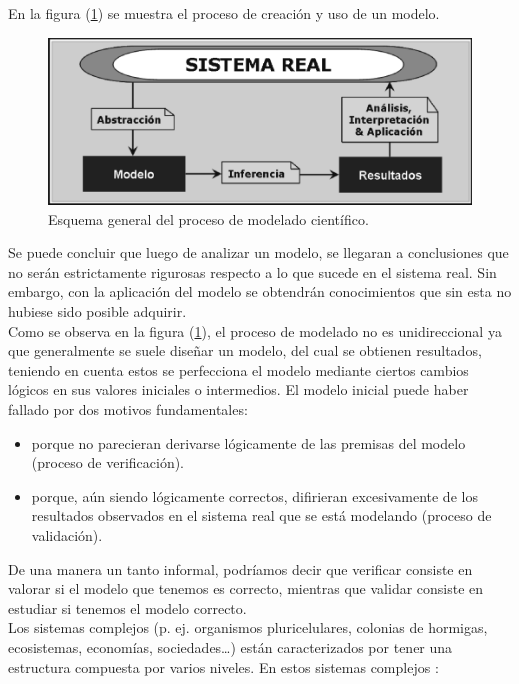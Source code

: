 En la figura (\ref{fig:img_1}) se muestra el proceso de creación y uso de un modelo.

\begin{figure}[!h]
	\centering
	\includegraphics[scale=0.5]{Images/esquema_modelado_cientifico.png}
	\caption{Esquema general del proceso de modelado científico. \parencite{izquierdo2008modelado}}
	\label{fig:img_1}
\end{figure}

Se puede concluir que luego de analizar un modelo, se llegaran a conclusiones que no serán estrictamente rigurosas respecto a lo que sucede en el sistema real. Sin embargo, con la aplicación del modelo se obtendrán conocimientos que sin esta no hubiese sido posible adquirir.\\

Como se observa en la figura (\ref{fig:img_1}), el proceso de modelado no es unidireccional ya que generalmente se suele diseñar un modelo, del cual se obtienen resultados, teniendo en cuenta estos se perfecciona el modelo mediante ciertos cambios lógicos en sus valores iniciales o intermedios. El modelo inicial puede haber fallado por dos motivos fundamentales:
\begin{itemize}
	\item porque no parecieran derivarse lógicamente de las premisas del modelo (proceso de verificación).
	\item porque, aún siendo lógicamente correctos, difirieran excesivamente de los resultados observados en el sistema real que se está modelando (proceso de validación). \parencite{izquierdo2008modelado}
\end{itemize}

De una manera un tanto informal, podríamos decir que verificar consiste en valorar si el modelo que tenemos es correcto, mientras que validar consiste en estudiar si tenemos el modelo correcto.\\


Los sistemas complejos (p. ej. organismos pluricelulares, colonias de hormigas, ecosistemas, economías, sociedades…) están caracterizados por tener una estructura compuesta por varios niveles. En estos sistemas complejos \parencite{vicsek2002complexity, gilbert2004agent}:

